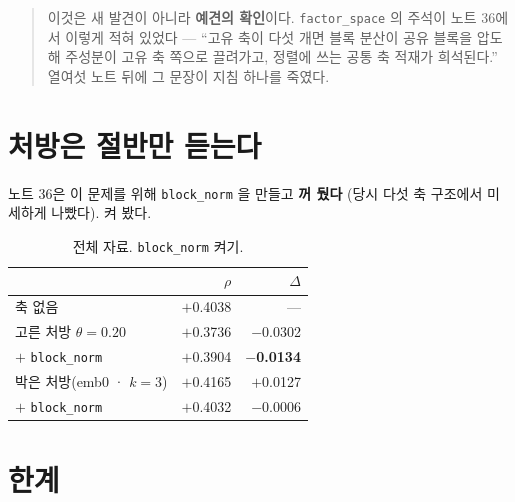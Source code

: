\documentclass[10pt]{article}
\begin{document}

\begin{quote}\fontsize{9.5}{11.5}\selectfont
이것은 새 발견이 아니라 \textbf{예견의 확인}이다. \texttt{factor\_space} 의
주석이 노트 36에서 이렇게 적혀 있었다 --- ``고유 축이 다섯 개면 블록 분산이
공유 블록을 압도해 주성분이 고유 축 쪽으로 끌려가고, 정렬에 쓰는 공통 축
적재가 희석된다.'' 열여섯 노트 뒤에 그 문장이 지침 하나를 죽였다.
\end{quote}

\section{처방은 절반만 듣는다}

노트 36은 이 문제를 위해 \texttt{block\_norm} 을 만들고 \textbf{꺼 뒀다}
(당시 다섯 축 구조에서 미세하게 나빴다). 켜 봤다.

\begin{table}[t]
\centering\tsize
\caption{전체 자료. \texttt{block\_norm} 켜기.}
\begin{tabular}{lrr}
\toprule
& $\rho$ & $\Delta$ \\
\midrule
축 없음 & $+$0.4038 & --- \\
고른 처방 $\theta{=}0.20$ & $+$0.3736 & $-$0.0302 \\
\quad $+$ \texttt{block\_norm} & $+$0.3904 & \textbf{$-$0.0134} \\
박은 처방(emb0 · $k{=}3$) & $+$0.4165 & $+$0.0127 \\
\quad $+$ \texttt{block\_norm} & $+$0.4032 & $-$0.0006 \\
\bottomrule
\end{tabular}
\end{table}


\section{한계}
\end{document}
